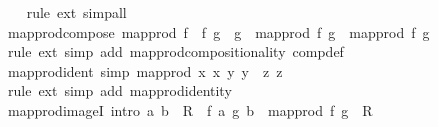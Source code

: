 \begin{isabellebody}
%
\isadelimproof
\ \ %
\endisadelimproof
%
\isatagproof
{}\isamarkupfalse%
\ {\isacharparenleft}{\kern0pt}rule\ ext{\isacharparenright}{\kern0pt}\ simp{\isacharunderscore}{\kern0pt}all%
\endisatagproof
{\isafoldproof}%
%
\isadelimproof
\isanewline
%
\endisadelimproof
\isanewline
{}\isamarkupfalse%
\ map{\isacharunderscore}{\kern0pt}prod{\isacharunderscore}{\kern0pt}compose{\isacharcolon}{\kern0pt}\ {\isachardoublequoteopen}map{\isacharunderscore}{\kern0pt}prod\ {\isacharparenleft}{\kern0pt}f{}\ {\isasymcirc}\ f{}{\isacharparenright}{\kern0pt}\ {\isacharparenleft}{\kern0pt}g{}\ {\isasymcirc}\ g{}{\isacharparenright}{\kern0pt}\ {\isacharequal}{\kern0pt}\ {\isacharparenleft}{\kern0pt}map{\isacharunderscore}{\kern0pt}prod\ f{}\ g{}\ {\isasymcirc}\ map{\isacharunderscore}{\kern0pt}prod\ f{}\ g{}{\isacharparenright}{\kern0pt}{\isachardoublequoteclose}\isanewline
%
\isadelimproof
\ \ %
\endisadelimproof
%
\isatagproof
{}\isamarkupfalse%
\ {\isacharparenleft}{\kern0pt}rule\ ext{\isacharparenright}{\kern0pt}\ {\isacharparenleft}{\kern0pt}simp\ add{\isacharcolon}{\kern0pt}\ map{\isacharunderscore}{\kern0pt}prod{\isachardot}{\kern0pt}compositionality\ comp{\isacharunderscore}{\kern0pt}def{\isacharparenright}{\kern0pt}%
\endisatagproof
{\isafoldproof}%
%
\isadelimproof
\isanewline
%
\endisadelimproof
\isanewline
{}\isamarkupfalse%
\ map{\isacharunderscore}{\kern0pt}prod{\isacharunderscore}{\kern0pt}ident\ {\isacharbrackleft}{\kern0pt}simp{\isacharbrackright}{\kern0pt}{\isacharcolon}{\kern0pt}\ {\isachardoublequoteopen}map{\isacharunderscore}{\kern0pt}prod\ {\isacharparenleft}{\kern0pt}{\isasymlambda}x{\isachardot}{\kern0pt}\ x{\isacharparenright}{\kern0pt}\ {\isacharparenleft}{\kern0pt}{\isasymlambda}y{\isachardot}{\kern0pt}\ y{\isacharparenright}{\kern0pt}\ {\isacharequal}{\kern0pt}\ {\isacharparenleft}{\kern0pt}{\isasymlambda}z{\isachardot}{\kern0pt}\ z{\isacharparenright}{\kern0pt}{\isachardoublequoteclose}\isanewline
%
\isadelimproof
\ \ %
\endisadelimproof
%
\isatagproof
{}\isamarkupfalse%
\ {\isacharparenleft}{\kern0pt}rule\ ext{\isacharparenright}{\kern0pt}\ {\isacharparenleft}{\kern0pt}simp\ add{\isacharcolon}{\kern0pt}\ map{\isacharunderscore}{\kern0pt}prod{\isachardot}{\kern0pt}identity{\isacharparenright}{\kern0pt}%
\endisatagproof
{\isafoldproof}%
%
\isadelimproof
\isanewline
%
\endisadelimproof
\isanewline
{}\isamarkupfalse%
\ map{\isacharunderscore}{\kern0pt}prod{\isacharunderscore}{\kern0pt}imageI\ {\isacharbrackleft}{\kern0pt}intro{\isacharbrackright}{\kern0pt}{\isacharcolon}{\kern0pt}\ {\isachardoublequoteopen}{\isacharparenleft}{\kern0pt}a{\isacharcomma}{\kern0pt}\ b{\isacharparenright}{\kern0pt}\ {\isasymin}\ R\ {\isasymLongrightarrow}\ {\isacharparenleft}{\kern0pt}f\ a{\isacharcomma}{\kern0pt}\ g\ b{\isacharparenright}{\kern0pt}\ {\isasymin}\ map{\isacharunderscore}{\kern0pt}prod\ f\ g\ {\isacharbackquote}{\kern0pt}\ R{\isachardoublequoteclose}\isanewline

\end{isabellebody}
